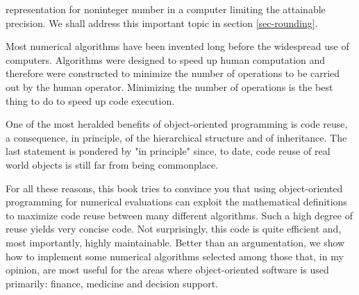 representation for noninteger number in a computer limiting the
attainable precision. We shall address this important topic in
section \ref{sec-rounding}.
\par
Most numerical algorithms have been invented long before the widespread use of computers. Algorithms were designed to speed up
human computation and therefore were constructed to minimize
the number of operations to be carried out by the human operator.
Minimizing the number of operations is the best thing to do to
speed up code execution.
\par
One of the most heralded benefits of object-oriented programming
is code reuse, a consequence, in principle, of the hierarchical
structure and of inheritance. The last statement is pondered by
"in principle" since, to date, code reuse of real world objects is
still far from being commonplace.
\par
For all these reasons, this book tries to convince you that using
object-oriented programming for numerical evaluations can exploit
the mathematical definitions to maximize code reuse between many
different algorithms. Such a high degree of reuse yields very
concise code. Not surprisingly, this code is quite efficient and,
most importantly, highly maintainable. Better than an
argumentation, we show how to implement some numerical algorithms
selected among those that, in my opinion, are most useful for the areas
where object-oriented software is used primarily: finance,
medicine and decision support.

